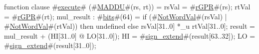 function clause #\hyperref[zexecute]{execute}# (#\hyperref[zMADDU]{MADDU}#(rs, rt)) =
  {
    rsVal = #\hyperref[zrGPR]{rGPR}#(rs);
    rtVal = #\hyperref[zrGPR]{rGPR}#(rt);
    mul_result : #\hyperref[zbits]{bits}#(64) = if (#\hyperref[zNotWordVal]{NotWordVal}#(rsVal) | #\hyperref[zNotWordVal]{NotWordVal}#(rtVal)) then
        undefined
      else
	rsVal[31..0] *_u rtVal[31..0];
    result = mul_result + (HI[31..0] @ LO[31..0]);
    HI = #\hyperref[zsignzyextend]{sign\_extend}#(result[63..32]);
    LO = #\hyperref[zsignzyextend]{sign\_extend}#(result[31..0]);
  }
